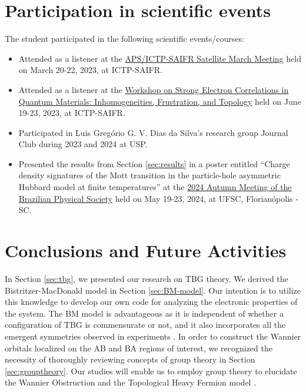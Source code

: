 \documentclass[12pt]{report}
\begin{document}
\chapter{Participation in scientific events} \label{chp:particEvento}

The student participated in the following scientific events/courses:

\begin{itemize}
\item Attended as a listener at the \href{https://www.ictp-saifr.org/apsmarch23/}{APS/ICTP-SAIFR Satellite March Meeting} held on March 20-22, 2023, at ICTP-SAIFR.
\item Attended as a listener at the \href{https://www.ictp-saifr.org/qm2023/}{Workshop on Strong Electron Correlations in Quantum Materials: Inhomogeneities, Frustration, and Topology} held on June 19-23, 2023, at ICTP-SAIFR.
\item Participated in Luis Gregório G. V. Dias da Silva's research group Journal Club during 2023 and 2024 at USP.
\item Presented the results from Section \ref{sec:results} in a poster entitled ``Charge density signatures of the Mott transition in the particle-hole asymmetric Hubbard model at finite temperatures'' at the \href{https://www1.fisica.org.br/~eosbf/2024/index.php/en/}{2024 Autumn Meeting of the Brazilian Physical Society} held on May 19-23, 2024, at UFSC, Florianópolis - SC.
\end{itemize}


\chapter{Conclusions and Future Activities} \label{chp:conclusions}

In Section \ref{sec:tbg}, we presented our research on TBG theory. We derived the Bistritzer-MacDonald model \cite{macdonald2011} in Section \ref{sec:BM-model}. Our intention is to utilize this knowledge to develop our own code for analyzing the electronic properties of the system. The BM model is advantageous as it is independent of whether a configuration of TBG is commensurate or not, and it also incorporates all the emergent symmetries observed in experiments \cite{zou2018}. In order to construct the Wannier orbitals localized on the AB and BA regions of interest, we recognized the necessity of thoroughly reviewing concepts of group theory in Section \ref{sec:grouptheory}. Our studies will enable us to employ group theory to elucidate the Wannier Obstruction \cite{zou2018} and the Topological Heavy Fermion model \cite{topoheavyfermion2022}.
\end{document}
